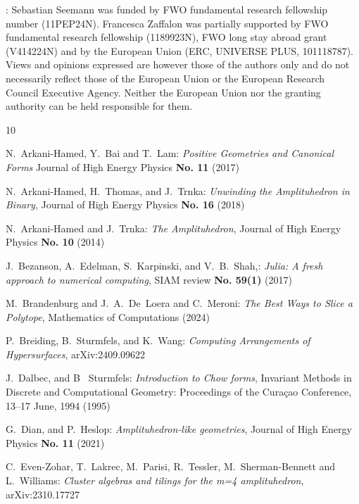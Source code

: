\documentclass[english]{ourlematema}
\begin{document}
\begin{footnotesize}
:
Sebastian Seemann was funded by FWO fundamental research fellowship number (11PEP24N).
Francesca Zaffalon was partially supported by  FWO fundamental research fellowship (1189923N), FWO long stay abroad grant (V414224N) and by the European Union (ERC, UNIVERSE PLUS, 101118787).
Views and opinions expressed are however those of the authors only and do not necessarily reflect those of the European Union or the European Research Council Executive Agency. Neither the European Union nor the granting authority can be held responsible for them.
\end{footnotesize}

\begin{small}
\begin{thebibliography}{10}
\setlength{\itemsep}{-0.1mm}

N.~Arkani-Hamed, Y.~Bai and T.~Lam:
    {\em Positive Geometries and Canonical Forms} Journal of High Energy Physics {\bf No. 11} (2017)

N.~Arkani-Hamed, H.~Thomas, and J.~Trnka:
    {\em Unwinding the Amplituhedron in Binary}, Journal of High Energy Physics {\bf No. 16} (2018) 

N.~Arkani-Hamed and J.~Trnka: 
    {\em The Amplituhedron}, Journal of High Energy Physics {\bf No. 10} (2014)

J.~Bezanson, A.~Edelman, S.~Karpinski, and V.~B.~Shah,: {\em Julia: A fresh approach to numerical computing}, SIAM review {\bf No. 59(1)} (2017)

M.~Brandenburg and J.~A.~De~Loera and C.~Meroni:
    {\em The Best Ways to Slice a Polytope}, 
    Mathematics of Computations (2024)
    
P.~Breiding, B.~Sturmfels, and K.~Wang: 
    {\em Computing Arrangements of Hypersurfaces}, arXiv:2409.09622

J.~Dalbec, and B~ Sturmfels:
    {\em Introduction to Chow forms}, Invariant Methods in Discrete and Computational Geometry: Proceedings of the Curaçao Conference, 13–17 June, 1994 (1995)

G.~Dian, and P.~Heslop: 
    {\em Amplituhedron-like geometries}, Journal of High Energy Physics {\bf No. 11} (2021)

C.~Even-Zohar, T.~Lakrec, M.~Parisi, R.~Tessler, M.~Sherman-Bennett and L.~Williams:
    {\em Cluster algebras and tilings for the m=4 amplituhedron}, 
    arXiv:2310.17727
    

\end{thebibliography}
\end{small}
\end{document}
